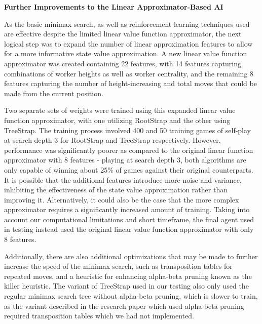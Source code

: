 \documentclass[a4paper,12pt,table]{article}
\begin{document}
\textbf{Further Improvements to the Linear Approximator-Based AI}

As the basic minimax search, as well as reinforcement learning techniques used are effective despite the limited linear value function approximator, the next logical step was to expand the number of linear approximation features to allow for a more informative state value approximation. A new linear value function approximator was created containing 22 features, with 14 features capturing combinations of worker heights as well as worker centrality, and the remaining 8 features capturing the number of height-increasing and total moves that could be made from the current position. \par

Two separate sets of weights were trained using this expanded linear value function approximator, with one utilizing RootStrap and the other using TreeStrap. The training process involved 400 and 50 training games of self-play at search depth 3 for RootStrap and TreeStrap respectively. However, performance was significantly poorer as compared to the original linear function approximator with 8 features - playing at search depth 3, both algorithms are only capable of winning about 25\% of games against their original counterparts. It is possible that the additional features introduce more noise and variance, inhibiting the effectiveness of the state value approximation rather than improving it. Alternatively, it could also be the case that the more complex approximator requires a significantly increased amount of training. Taking into account our computational limitations and short timeframe, the final agent used in testing instead used the original linear value function approximator with only 8 features. \par

Additionally, there are also additional optimizations that may be made to further increase the speed of the minimax search, such as transposition tables for repeated moves, and a heuristic for enhancing alpha-beta pruning known as the killer heuristic. \cite{Artificial Intelligence: A Modern Approach} The variant of TreeStrap used in our testing also only used the regular minimax search tree without alpha-beta pruning, which is slower to train, as the variant described in the research paper \cite{Bootstrapping from Game Tree Search} which used alpha-beta pruning required transposition tables which we had not implemented. \par
\end{document}

